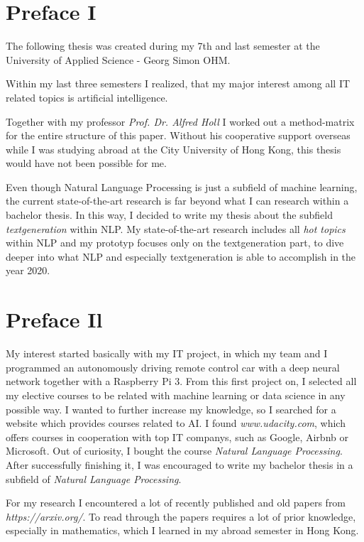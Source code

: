 \thispagestyle{empty}
\section*{Preface I}
\label{sec:prolog_1}

The following thesis was created during my 7th and last semester at the University of Applied Science - Georg Simon OHM. 

Within my last three semesters I realized, that my major interest among all IT related topics is artificial intelligence.

Together with my professor \textit{Prof. Dr. Alfred Holl} I worked out a method-matrix for the entire structure of this paper. Without his cooperative support overseas while I was studying abroad at the City University of Hong Kong, this thesis would have not been possible for me.

Even though Natural Language Processing is just a subfield of machine learning, the current state-of-the-art research is far beyond what I can research within a bachelor thesis. In this way, I decided to write my thesis about the subfield \textit{textgeneration} within NLP. My state-of-the-art research includes all \textit{hot topics} within NLP and my prototyp focuses only on the textgeneration part, to dive deeper into what NLP and especially textgeneration is able to accomplish in the year 2020.

\newpage

\section*{Preface Il}
\label{sec:prolog_2}

My interest started basically with my IT project, in which my team and I programmed an autonomously driving remote control car with a deep neural network together with a Raspberry Pi 3. From this first project on, I selected all my elective courses to be related with machine learning or data science in any possible way. I wanted to further increase my knowledge, so I searched for a website which provides courses related to AI. I found \textit{www.udacity.com}, which offers courses  in cooperation with top IT companys, such as Google, Airbnb or Microsoft. Out of curiosity, I bought the course \textit{Natural Language Processing}. After successfully finishing it, I was encouraged to write my bachelor thesis in a subfield of \textit{Natural Language Processing}. 

For my research I encountered a lot of recently published and old papers from \textit{https://arxiv.org/}. 
To read through the papers requires a lot of prior knowledge, especially in mathematics, which I learned in my abroad semester in Hong Kong. 

